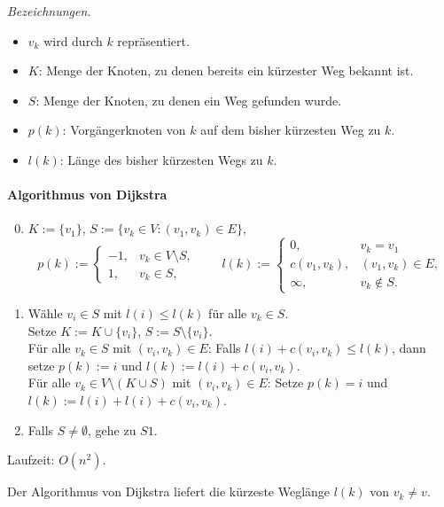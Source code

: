 \emph{Bezeichnungen.}
\begin{itemize}
\item $v_k$ wird durch $k$ repräsentiert.
\item $K$: Menge der Knoten, zu denen bereits ein kürzester Weg bekannt ist.
\item $S$: Menge der Knoten, zu denen ein Weg gefunden wurde.
\item $p(k)$: Vorgängerknoten von $k$ auf dem bisher kürzesten Weg zu $k$.
\item $l(k)$: Länge des bisher kürzesten Wegs zu $k$.
\end{itemize}

\paragraph{Algorithmus von Dijkstra}
\begin{enumerate}[S1:]
  \setcounter{enumi}{-1}
\item $K := \{v_1\}$, $S := \{ v_k \in V : (v_1, v_k) \in E \}$,
  \[ p(k) := \begin{cases}
      -1, &v_k \in V \setminus S, \\
      1, &v_k \in S,
    \end{cases}
    \qquad
    l(k) := \begin{cases}
      0, & v_k = v_1 \\
      c(v_1,v_k), & (v_1, v_k) \in E, \\
      \infty, & v_k \notin S.
    \end{cases}
  \]
\item Wähle $v_i \in S$ mit $l(i) \le l(k)$ für alle $v_k \in S$. \\
  Setze $K := K \cup \{ v_i \}$, $S := S \setminus \{v_i\}$. \\
  Für alle $v_k \in S$ mit $(v_i, v_k) \in E$: Falls $l(i) + c(v_i,v_k) \le
  l(k)$, dann setze $p(k) := i$ und $l(k) := l(i) + c(v_i,v_k)$. \\
  Für alle $v_k \in V \setminus (K \cup S)$ mit $(v_i, v_k) \in E$: Setze $p(k) =
  i$ und $l(k) := l(i) + l(i) + c(v_i,v_k)$.
\item[] Falls $S \ne \emptyset$, gehe zu $S1$.
\end{enumerate}

Laufzeit: $O(n^2)$.

\begin{aus}
  Der Algorithmus von Dijkstra liefert die kürzeste Weglänge $l(k)$ von $v_k \ne
  v$.
\end{aus}

